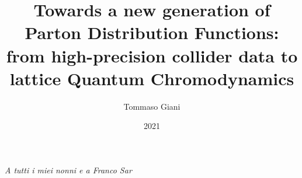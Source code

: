 \documentclass[a4paper,12pt,oneside,openright]{book}
\title{Towards a new generation of Parton Distribution Functions: from high-precision collider data to lattice
Quantum Chromodynamics }
\author{Tommaso Giani}
\date{2021} %
\begin{document}
\singlespacing
\maketitlepage
\eighteenptleading
\frontmatter




\cleardoublepage
{}
{\itshape A tutti i miei nonni
e a Franco Sar}
\cleardoublepage


\clearpage
\newpage
\tableofcontents
\mainmatter














\appendix
{}
\setcounter{equation}{0}








\clearpage
\newpage


\end{document}
